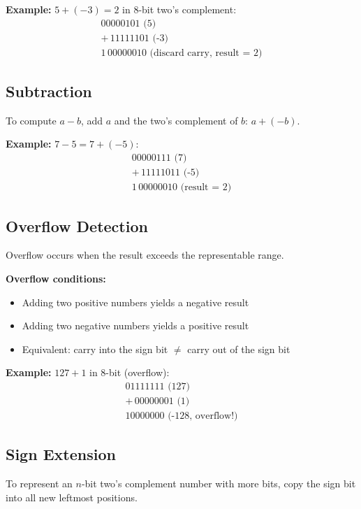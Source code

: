 \documentclass{report}
\begin{document}
\textbf{Example:} $5 + (-3) = 2$ in 8-bit two's complement:
\begin{align*}
    00000101 \text{ (5)} \\
    + \, 11111101 \text{ (-3)} \\
    \hline
    1\,00000010 \text{ (discard carry, result = 2)}
\end{align*}

\subsection{Subtraction}

To compute $a - b$, add $a$ and the two's complement of $b$: $a + (-b)$.

\textbf{Example:} $7 - 5 = 7 + (-5)$:
\begin{align*}
    00000111 \text{ (7)} \\
    + \, 11111011 \text{ (-5)} \\
    \hline
    1\,00000010 \text{ (result = 2)}
\end{align*}

\subsection{Overflow Detection}

Overflow occurs when the result exceeds the representable range.

\textbf{Overflow conditions:}
\begin{itemize}
    \item Adding two positive numbers yields a negative result
    \item Adding two negative numbers yields a positive result
    \item Equivalent: carry into the sign bit $\neq$ carry out of the sign bit
\end{itemize}

\textbf{Example:} $127 + 1$ in 8-bit (overflow):
\begin{align*}
    01111111 \text{ (127)} \\
    + \, 00000001 \text{ (1)} \\
    \hline
    10000000 \text{ (-128, overflow!)}
\end{align*}

\subsection{Sign Extension}

To represent an $n$-bit two's complement number with more bits, copy the sign bit into all new leftmost positions.
\end{document}

